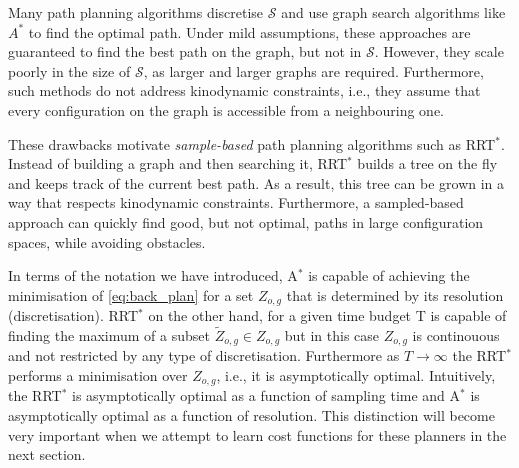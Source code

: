 \documentclass{article}  %
\begin{document}
Many path planning algorithms discretise $\mathcal{S}$ and use graph search algorithms like $A^*$ to find the optimal path. Under mild assumptions, these approaches are guaranteed to find the best path on the graph, but not in $\mathcal{S}$. However, they scale poorly in the size of $\mathcal{S}$, as larger and larger graphs are required. Furthermore, such methods do not address kinodynamic constraints, i.e., they assume that every configuration on the graph is accessible from a neighbouring one. 

These drawbacks motivate \emph{sample-based} path planning algorithms such as RRT$^*$. Instead of building a graph and then searching it, RRT$^*$ builds a tree on the fly and keeps track of the current best path. As a result, this tree can be grown in a way that respects kinodynamic constraints. Furthermore, a sampled-based approach can quickly find good, but not optimal, paths in large configuration spaces, while avoiding obstacles.



In terms of the notation we have introduced, A$^*$ is capable of achieving the minimisation of \eqref{eq:back_plan} for a set $Z_{o,g}$ that is determined by its resolution (discretisation). RRT$^*$ on the other hand, for a given time budget T is capable of finding the maximum of a subset $\tilde{Z}_{o,g} \in  Z_{o,g}$ but in this case $Z_{o,g}$ is continouous and not restricted by any type of discretisation. Furthermore as $T \rightarrow \infty$ the RRT$^*$ performs a minimisation over $Z_{o,g}$, i.e., it is asymptotically optimal. Intuitively, the RRT$^*$ is asymptotically optimal as a function of sampling time and A$^*$ is asymptotically optimal as a function of resolution. This distinction will become very important when we attempt to learn cost functions for these planners in the next section.
\end{document}
